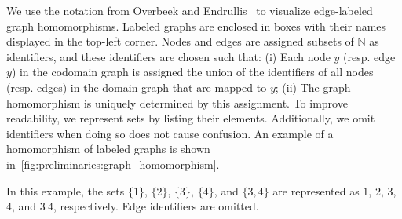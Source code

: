 \begin{notation}
    \label{notation:graph_homomorphism}
    We use the notation from Overbeek and Endrullis~\cite[Notation 1]{overbeek2023apbpotutorial} to visualize edge-labeled graph homomorphisms. Labeled graphs are enclosed in boxes with their names displayed in the top-left corner. Nodes and edges are assigned subsets of \(\mathbb{N}\) as identifiers, and these identifiers are chosen such that: (i) Each node \( y \) (resp. edge \( y \)) in the codomain graph is assigned the union of the identifiers of all nodes (resp. edges) in the domain graph that are mapped to \( y \); (ii) The graph homomorphism is uniquely determined by this assignment. To improve readability, we represent sets by listing their elements. Additionally, we omit identifiers when doing so does not cause confusion. An example of a homomorphism of labeled graphs is shown in~\autoref{fig:preliminaries:graph_homomorphism}.
    
    \begin{figure}[!ht]
        \centering
    \caption{}
    \label{fig:preliminaries:graph_homomorphism}
    \end{figure}
    In this example, the sets \(\{1\}\), \(\{2\}\), \(\{3\}\), \(\{4\}\), and \(\{3,4\}\) are represented as \(1\), \(2\), \(3\), \(4\), and \(3\ 4\), respectively. Edge identifiers are omitted.
\end{notation} 


